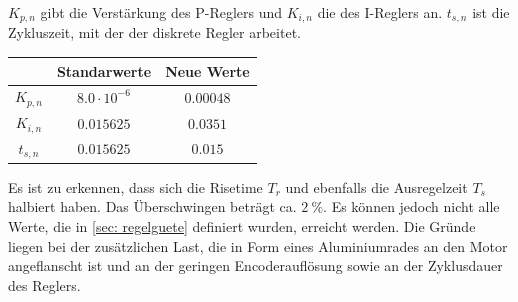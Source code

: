 \documentclass[./\jobname.tex]{subfiles}
\begin{document}
%
\(K_{p,n}\) gibt die Verstärkung des P-Reglers und \(K_{i,n}\) die des I-Reglers an. \(t_{s,n}\) ist die Zykluszeit, mit der der diskrete Regler arbeitet.
%
\begin{table}[H]
\centering
\begin{tabular}{|c|c|c|}\hline 
			& Standarwerte  & Neue Werte \\ \hline 
\(K_{p,n}\)	& \(8.0 \cdot 10^{-6}\) & \(0.00048\)\\ \hline 
\(K_{i,n}\)	& \(0.015625\) & \(0.0351\)\\ \hline 
\(t_{s,n}\)	& \(0.015625\) &\( 0.015\)\\ \hline 
\end{tabular} 
\label{tab: regler parameter}
\end{table}
%
%
Es ist zu erkennen, dass sich die Risetime \(T_{r}\) und ebenfalls die Ausregelzeit \(T_{s}\) halbiert haben. Das Überschwingen beträgt ca. \(2~\%\). Es können jedoch nicht alle Werte, die in \autoref{sec: regelguete} definiert wurden, erreicht werden. Die Gründe liegen bei der zusätzlichen Last, die in Form eines Aluminiumrades an den Motor angeflanscht ist und an der geringen Encoderauflösung sowie an der Zyklusdauer des Reglers.
%
\begin{figure}[H]
	\centering
	\noindent{}
	\label{fig: stepresponse_new.pdf}
\end{figure}
\end{document}
